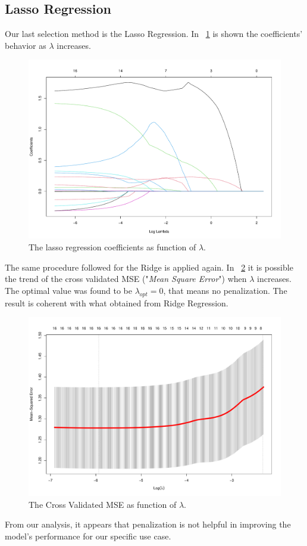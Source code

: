 \subsection{Lasso Regression}

Our last selection method is the Lasso Regression. In \Fig~\ref{fig:LassoCoefVsLambda} is shown the coefficients' behavior as $\lambda$ increases. 

\begin{figure}[h]
	\centering
	\includegraphics[width=0.4\linewidth]{ImageFiles/Regression/Lasso/LassoCoefVsLambda}
	\caption{The lasso regression coefficients as function of $\lambda$.}
	\label{fig:LassoCoefVsLambda}
\end{figure}

The same procedure followed for the Ridge is applied again. In \Fig~\ref{fig:LassoCvPlot} it is possible the trend of the cross validated MSE ("\textit{Mean Square Error}") when $\lambda$ increases. The optimal value was found to be $\lambda_{opt} = 0$, that means no penalization. The result is coherent with what obtained from Ridge Regression.

\begin{figure}[h]
	\centering
	\includegraphics[width=0.5\linewidth]{ImageFiles/Regression/Lasso/LassoCvPlot}
	\caption{The Cross Validated MSE as function of $\lambda$.}
	\label{fig:LassoCvPlot}
\end{figure}

From our analysis, it appears that penalization is not helpful in improving the model's performance for our specific use case.